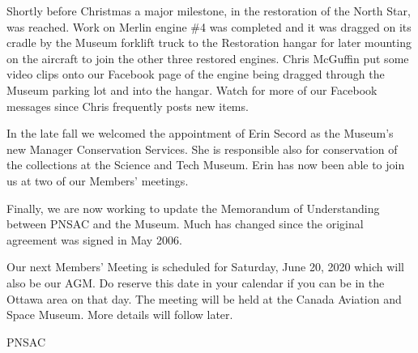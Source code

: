 Shortly before Christmas a major milestone, in the  restoration of the
North Star, was reached. Work on Merlin engine \#4 was completed and it
was dragged on its cradle by the Museum forklift truck to the
Restoration hangar for later mounting on the aircraft to join the other
three restored engines. Chris McGuffin put some video clips onto our
Facebook page of the engine being dragged through the Museum parking
lot and into the hangar. Watch for more of our Facebook messages since
Chris frequently posts new items.

In the late fall we welcomed the appointment of Erin Secord as the
Museum's new Manager Conservation Services. She is responsible also for
conservation of the collections at the Science and Tech Museum. Erin
has now been able to join us at two of our Members' meetings.

Finally, we are now working to update the Memorandum of Understanding
between PNSAC and the Museum.  Much has changed since the original
agreement was signed in May 2006.

Our next Members' Meeting is scheduled for Saturday, June 20, 2020
which will also be our AGM. Do reserve this date in your calendar if
you can be in the Ottawa area on that day. The meeting will be held at
the Canada Aviation and Space Museum. More details will follow later.

\begin{footnotesize}
    \raggedleft PNSAC\\
\end{footnotesize}



